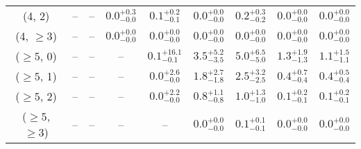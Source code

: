 \begin{table}[h!]
{\begin{tabular}{ccccccccc}
	(4, 2) & -- & -- & $0.0^{+ 0.3 }_{- 0.0 }$ & $0.1^{+ 0.2 }_{- 0.1 }$ & $0.0^{+ 0.0 }_{- 0.0 }$ & $0.2^{+ 0.3 }_{- 0.2 }$ & $0.0^{+ 0.0 }_{- 0.0 }$ & $0.0^{+ 0.0 }_{- 0.0 }$ \\[0.5ex] 
	(4, $\ge3$) & -- & -- & $0.0^{+ 0.0 }_{- 0.0 }$ & $0.0^{+ 0.0 }_{- 0.0 }$ & $0.0^{+ 0.0 }_{- 0.0 }$ & $0.0^{+ 0.0 }_{- 0.0 }$ & $0.0^{+ 0.0 }_{- 0.0 }$ & $0.0^{+ 0.0 }_{- 0.0 }$ \\[0.5ex] 
	($\ge5$, 0) & -- & -- & -- & $0.1^{+ 16.1 }_{- 0.1 }$ & $3.5^{+ 5.2 }_{- 3.5 }$ & $5.0^{+ 6.5 }_{- 5.0 }$ & $1.3^{+ 1.9 }_{- 1.3 }$ & $1.1^{+ 1.5 }_{- 1.1 }$ \\[0.5ex] 
	($\ge5$, 1) & -- & -- & -- & $0.0^{+ 2.6 }_{- 0.0 }$ & $1.8^{+ 2.7 }_{- 1.8 }$ & $2.5^{+ 3.2 }_{- 2.5 }$ & $0.4^{+ 0.7 }_{- 0.4 }$ & $0.4^{+ 0.5 }_{- 0.4 }$ \\[0.5ex] 
	($\ge5$, 2) & -- & -- & -- & $0.0^{+ 2.2 }_{- 0.0 }$ & $0.8^{+ 1.1 }_{- 0.8 }$ & $1.0^{+ 1.3 }_{- 1.0 }$ & $0.1^{+ 0.2 }_{- 0.1 }$ & $0.1^{+ 0.2 }_{- 0.1 }$ \\[0.5ex] 
	($\ge5$, $\ge3$) & -- & -- & -- & -- & $0.0^{+ 0.0 }_{- 0.0 }$ & $0.1^{+ 0.1 }_{- 0.1 }$ & $0.0^{+ 0.0 }_{- 0.0 }$ & $0.0^{+ 0.0 }_{- 0.0 }$ \\[0.5ex] 
	\hline
	\hline
\end{tabular}}
\end{table}
